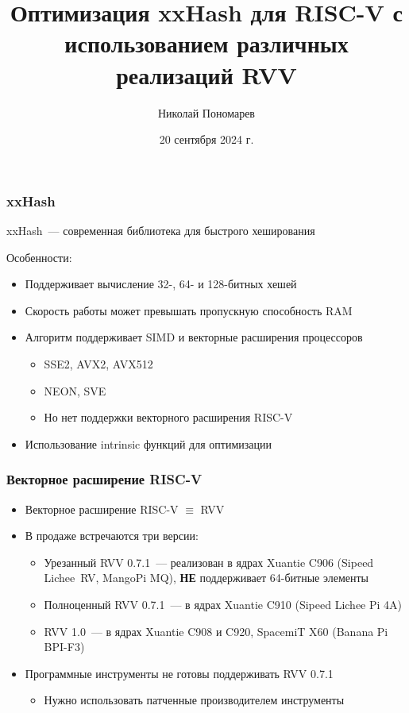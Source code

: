 \documentclass[
    aspectratio=169,
]{beamer}
\title[Оптимизация xxHash для RISC-V]{Оптимизация xxHash для RISC-V с использованием различных реализаций RVV}
\author{Николай Пономарев}
\institute[Матмех СПбГУ]{Математико-механический факультет СПбГУ}
\date{20 сентября 2024 г.}
\begin{document}
\begin{frame}
    \maketitle
\end{frame}


\begin{frame}
    \frametitle{xxHash}

    xxHash~--- современная библиотека для быстрого хеширования

    Особенности:
    \begin{itemize}
        \item Поддерживает вычисление 32-, 64- и 128-битных хешей
        \item Скорость работы может превышать пропускную способность RAM
        \item Алгоритм поддерживает SIMD и векторные расширения процессоров
              \begin{itemize}
                  \item SSE2, AVX2, AVX512
                  \item NEON, SVE
                  \item Но нет поддержки векторного расширения RISC-V
              \end{itemize}
        \item Использование intrinsic функций для оптимизации
    \end{itemize}

\end{frame}


\begin{frame}
    \frametitle{Векторное расширение RISC-V}

    \begin{itemize}
        \item Векторное расширение RISC-V $\equiv$ RVV
        \item В продаже встречаются три версии:
              \begin{itemize}
                  \item Урезанный RVV 0.7.1~--- реализован в ядрах Xuantie C906 (Sipeed Lichee~RV, MangoPi MQ), \textbf{НЕ} поддерживает 64-битные элементы
                  \item Полноценный RVV 0.7.1~--- в ядрах Xuantie C910 (Sipeed Lichee Pi 4A)
                  \item RVV 1.0~--- в ядрах Xuantie C908 и C920, SpacemiT X60 (Banana Pi BPI-F3)
              \end{itemize}
        \item Программные инструменты не готовы поддерживать RVV 0.7.1
              \begin{itemize}
                  \item Нужно использовать патченные производителем инструменты
              \end{itemize}
    \end{itemize}

\end{frame}
\end{document}

